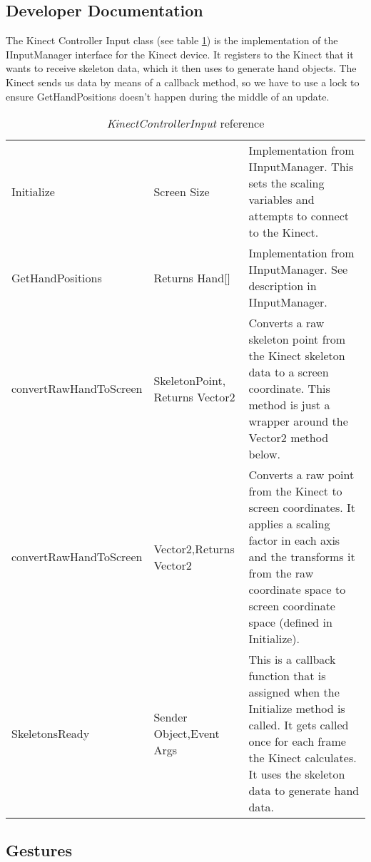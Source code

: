 \clearpage{}
\subsection{Developer Documentation}
The Kinect Controller Input class (see table \ref{KinectInputRef}) is the implementation of the IInputManager interface for the Kinect device. It registers to the Kinect that it wants to receive skeleton data, which it then uses to generate hand objects. The Kinect sends us data by means of a callback method, so we have to use a lock to ensure GetHandPositions doesn't happen during the middle of an update.

\begin{table}[h]
\begin{tabular}{|>{\raggedright}p{5cm}|>{\raggedright}p{3.6cm}|>{\raggedright}p{7cm}|}
\hline 
\multicolumn{3}{|c|}{KinectControllerInput}\tabularnewline
\hline 
Initialize & Screen Size & Implementation from IInputManager. This sets the scaling variables
and attempts to connect to the Kinect.\tabularnewline
\hline 
GetHandPositions & Returns Hand{[}{]} & Implementation from IInputManager. See description in IInputManager.\tabularnewline
\hline 
convertRawHandToScreen & SkeletonPoint, Returns Vector2 & Converts a raw skeleton point from the Kinect skeleton data to a screen
coordinate. This method is just a wrapper around the Vector2 method
below.\tabularnewline
\hline 
convertRawHandToScreen & Vector2,\newline Returns Vector2 & Converts a raw point from the Kinect to screen coordinates. It applies
a scaling factor in each axis and the transforms it from the raw coordinate
space to screen coordinate space (defined in Initialize).\tabularnewline
\hline 
SkeletonsReady & Sender Object,\newline Event Args & This is a callback function that is assigned when the Initialize method
is called. It gets called once for each frame the Kinect calculates.
It uses the skeleton data to generate hand data.\tabularnewline
\hline 
\end{tabular}

\caption{\emph{KinectControllerInput} reference}

\label{KinectInputRef}
\end{table}

\clearpage{}
\subsection{Gestures}

